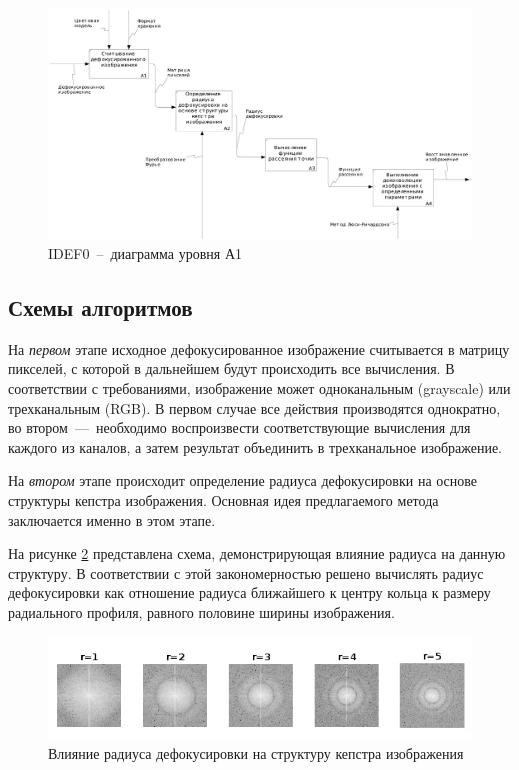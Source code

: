 \begin{figure}[H]
	\centering
	\includegraphics[scale=0.4]{assets/02_A0}
	\caption{IDEF0~--~диаграмма уровня А1}
	\label{idef0-a1}
\end{figure}

\subsection{Схемы алгоритмов} 

На \textit{первом} этапе исходное дефокусированное изображение считывается в матрицу пикселей, с которой в дальнейшем будут происходить все вычисления. В соответствии с требованиями, изображение может одноканальным (grayscale) или трехканальным (RGB). В первом случае все действия производятся однократно, во втором~---~необходимо воспроизвести соответствующие вычисления для каждого из каналов, а затем результат объединить в трехканальное изображение.

На \textit{втором} этапе происходит определение радиуса дефокусировки на основе структуры кепстра изображения. Основная идея предлагаемого метода заключается именно в этом этапе.

На рисунке \ref{r=15} представлена схема, демонстрирующая влияние радиуса на данную структуру. В соответствии с этой закономерностью решено вычислять радиус дефокусировки как отношение радиуса ближайшего к центру кольца к размеру радиального профиля, равного половине ширины изображения.

\begin{figure}[H]
	\centering
	\includegraphics[scale=0.9]{assets/r15.jpg}
	\caption{Влияние радиуса дефокусировки на структуру кепстра изображения}
	\label{r=15}
\end{figure}

